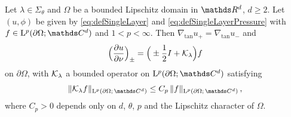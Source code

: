 \begin{thm}
  \label{thm:jumpConditions}
  Let $\lambda \in \Sigma_\theta$ and $\Omega$ be a bounded Lipschitz domain in $\R^d$, $d \geq 2$. 
  Let $(u,\phi)$ be given by \eqref{eq:defSingleLayer} and \eqref{eq:defSingleLayerPressure} with $f \in \Ell^p(\partial\Omega; \C^d)$ and $1 < p < \infty$.
  Then $\nabla_{\mathrm{tan}} u_+ = \nabla_{\mathrm{tan}} u_-$ and
  \begin{align}
    \label{eq:nontangentialConormalDerivative}
    \Big( \frac{\partial u}{\partial \nu} \Big)_\pm = \Big( \pm \frac{1}{2} I + \mathcal{K}_\lambda \Big) f
  \end{align}
  on $\partial\Omega$, with $\mathcal{K}_\lambda$ a bounded operator on $\Ell^p(\partial\Omega; \C^d)$ satisfying
  \begin{align*}
    \| \K_\lambda f \|_{\Ell^p(\partial\Omega;\, \C^d)} \leq C_p\, \|f\|_{\Ell^p(\partial\Omega;\, \C^d)}\,,
  \end{align*}
  where $C_p > 0$ depends only on $d$, $\theta$, $p$ and the Lipschitz character of $\Omega$.
\end{thm}

